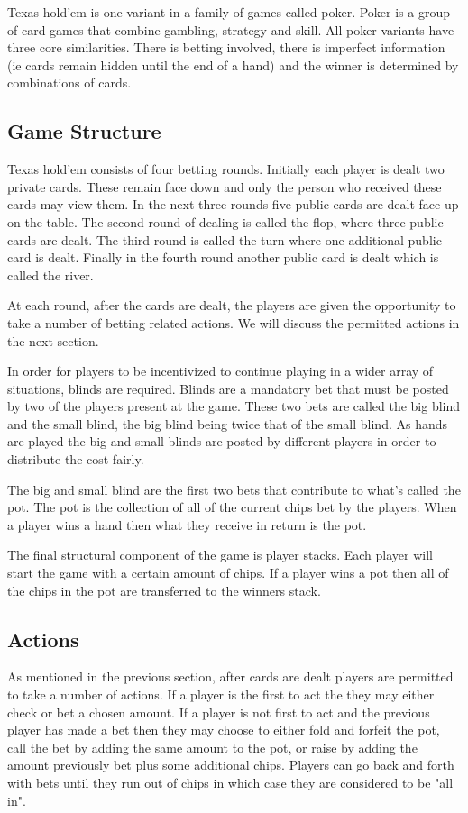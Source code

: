 Texas hold'em is one variant in a family of games called poker.
Poker is a group of card games that combine gambling, strategy and skill.
All poker variants have three core similarities.
There is betting involved, there is imperfect information (ie cards remain hidden until the end of a hand)
and the winner is determined by combinations of cards.

\subsection{Game Structure}\label{subsec:bettingRounds}
Texas hold'em consists of four betting rounds.
Initially each player is dealt two private cards.
These remain face down and only the person who received these cards may view them.
In the next three rounds five public cards are dealt face up on the table.
The second round of dealing is called the flop, where three public cards are dealt.
The third round is called the turn where one additional public card is dealt.
Finally in the fourth round another public card is dealt which is called the river.

At each round, after the cards are dealt, the players are given the opportunity to take a number of betting
related actions.
We will discuss the permitted actions in the next section.

In order for players to be incentivized to continue playing in a wider array of situations, blinds are required.
Blinds are a mandatory bet that must be posted by two of the players present at the game.
These two bets are called the big blind and the small blind, the big blind being twice that of the small blind.
As hands are played the big and small blinds are posted by different players in order to distribute the cost fairly.

The big and small blind are the first two bets that contribute to what's called the pot.
The pot is the collection of all of the current chips bet by the players.
When a player wins a hand then what they receive in return is the pot.

The final structural component of the game is player stacks.
Each player will start the game with a certain amount of chips.
If a player wins a pot then all of the chips in the pot are transferred to the winners stack.

\subsection{Actions}\label{subsec:actions}
As mentioned in the previous section, after cards are dealt players are permitted to take a number of actions.
If a player is the first to act the they may either check or bet a chosen amount.
If a player is not first to act and the previous player has made a bet then they may choose
to either fold and forfeit the pot, call the bet by adding the same amount to the pot, or raise by
adding the amount previously bet plus some additional chips.
Players can go back and forth with bets until they run out of chips in which case they are
considered to be "all in".

